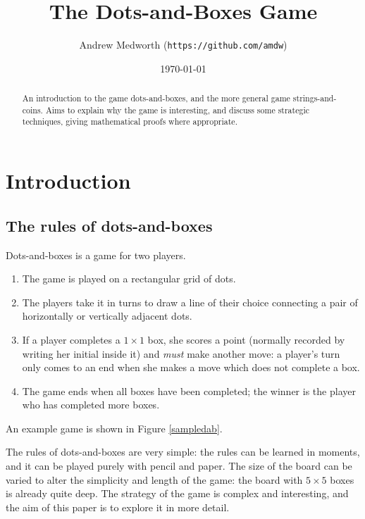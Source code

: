 \documentclass[a4paper,twocolumn]{article}
\begin{document}
\title{The Dots-and-Boxes Game}
\author{Andrew Medworth (\texttt{https://github.com/amdw})}
\date{\today}
\maketitle

\begin{abstract}
  An introduction to the game dots-and-boxes, and the more general game
  strings-and-coins. Aims to explain why the game is interesting, and discuss
  some strategic techniques, giving mathematical proofs where appropriate.
\end{abstract}

\tableofcontents

\section{Introduction}

\subsection{The rules of dots-and-boxes}

Dots-and-boxes is a game for two players.

\begin{enumerate}
  \item The game is played on a rectangular grid of dots.
  \item The players take it in turns to draw a line of their choice
    connecting a pair of horizontally or vertically adjacent dots.
  \item If a player completes a $1 \times 1$ box, she scores a point
    (normally recorded by writing her initial inside it) and
    \emph{must} make another move: a player's turn only comes to an
    end when she makes a move which does not complete a box.
  \item The game ends when all boxes have been completed; the winner
    is the player who has completed more boxes.
\end{enumerate}

An example game is shown in Figure \ref{sampledab}.

\begin{figure*}
  \centering
  \def\svgscale{0.7}
  
  \caption{Sample dots-and-boxes game}
  \label{sampledab}
\end{figure*}

The rules of dots-and-boxes are very simple: the rules can be learned
in moments, and it can be played purely with pencil and paper. The
size of the board can be varied to alter the simplicity and length of
the game: the board with $5 \times 5$ boxes is already quite deep. The
strategy of the game is complex and interesting, and the aim of this
paper is to explore it in more detail.
\end{document}

